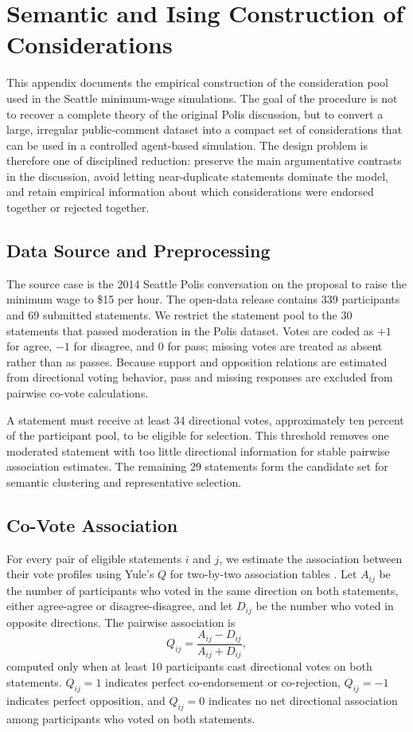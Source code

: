 \section{Semantic and Ising Construction of Considerations}

This appendix documents the empirical construction of the consideration pool
used in the Seattle minimum-wage simulations. The goal of the procedure is not
to recover a complete theory of the original Polis discussion, but to convert a
large, irregular public-comment dataset into a compact set of considerations
that can be used in a controlled agent-based simulation. The design problem is
therefore one of disciplined reduction: preserve the main argumentative
contrasts in the discussion, avoid letting near-duplicate statements dominate
the model, and retain empirical information about which considerations were
endorsed together or rejected together.

\subsection{Data Source and Preprocessing}

The source case is the 2014 Seattle Polis conversation on the proposal to raise
the minimum wage to \$15 per hour. The open-data release contains 339
participants and 69 submitted statements. We restrict the statement pool to the
30 statements that passed moderation in the Polis dataset. Votes are coded as
$+1$ for agree, $-1$ for disagree, and $0$ for pass; missing votes are treated
as absent rather than as passes. Because support and opposition relations are
estimated from directional voting behavior, pass and missing responses are
excluded from pairwise co-vote calculations.

A statement must receive at least 34 directional votes, approximately ten
percent of the participant pool, to be eligible for selection. This threshold
removes one moderated statement with too little directional information for
stable pairwise association estimates. The remaining 29 statements form the
candidate set for semantic clustering and representative selection.

\subsection{Co-Vote Association}

For every pair of eligible statements $i$ and $j$, we estimate the association
between their vote profiles using Yule's $Q$ for two-by-two association tables
\citep{yule1912}. Let $A_{ij}$ be the number of participants who voted in the
same direction on both statements, either agree-agree or disagree-disagree, and
let $D_{ij}$ be the number who voted in opposite directions. The pairwise
association is
\[
Q_{ij} = \frac{A_{ij} - D_{ij}}{A_{ij} + D_{ij}},
\]
computed only when at least 10 participants cast directional votes on both
statements. $Q_{ij}=1$ indicates perfect co-endorsement or co-rejection,
$Q_{ij}=-1$ indicates perfect opposition, and $Q_{ij}=0$ indicates no net
directional association among participants who voted on both statements.

